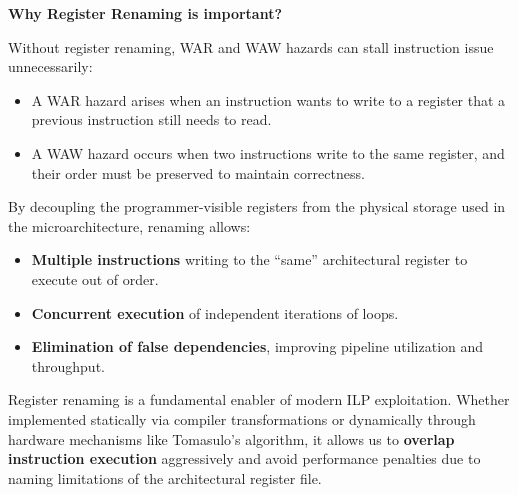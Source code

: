 \highspace
\begin{flushleft}
    \textcolor{Green3}{ \textbf{Why Register Renaming is important?}}
\end{flushleft}
Without register renaming, WAR and WAW hazards can stall instruction issue unnecessarily:
\begin{itemize}
    \item A WAR hazard arises when an instruction wants to write to a register that a previous instruction still needs to read.
    \item A WAW hazard occurs when two instructions write to the same register, and their order must be preserved to maintain correctness.
\end{itemize}
By decoupling the programmer-visible registers from the physical storage used in the microarchitecture, renaming allows:
\begin{itemize}[label=\textcolor{Green3}{}]
    \item \textbf{Multiple instructions} writing to the ``same'' architectural register to execute out of order.
    \item \textbf{Concurrent execution} of independent iterations of loops.
    \item \textbf{Elimination of false dependencies}, improving pipeline utilization and throughput.
\end{itemize}

\highspace
Register renaming is a fundamental enabler of modern ILP exploitation. Whether implemented statically via compiler transformations or dynamically through hardware mechanisms like Tomasulo's algorithm, it allows us to \textbf{overlap instruction execution} aggressively and avoid performance penalties due to naming limitations of the architectural register file.
